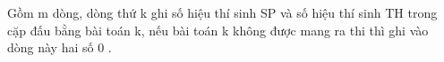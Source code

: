 Gồm m dòng, dòng thứ k ghi số hiệu thí sinh SP và số hiệu thí sinh TH trong cặp đấu bằng bài toán k, nếu bài toán k không được mang ra thi thì ghi vào dòng này hai số 0 .